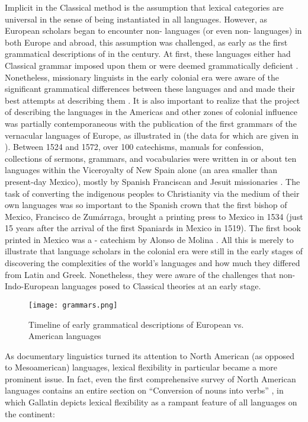 Implicit in the Classical method is the assumption that lexical categories are universal in the sense of being instantiated in all languages. However, as European scholars began to encounter non- languages (or even non- languages) in both Europe and abroad, this assumption was challenged, as early as the first grammatical descriptions of  in the  century. At first, these languages either had Classical grammar imposed upon them or were deemed grammatically deficient \parencite[3]{Suarez1983}. Nonetheless, missionary linguists in the early colonial era were aware of the significant grammatical differences between these languages and  and made their best attempts at describing them \parencite[3--4]{Suarez1983}. It is also important to realize that the project of describing the languages in the Americas and other zones of colonial influence was partially contemporaneous with the publication of the first grammars of the vernacular languages of Europe, as illustrated in  (the data for which are given in ). Between 1524 and 1572, over 100 catechisms, manuals for confession, collections of sermons, grammars, and vocabularies were written in or about ten languages within the Viceroyalty of New Spain alone (an area smaller than present-day Mexico), mostly by Spanish Franciscan and Jesuit missionaries \parencite[2]{Suarez1983}. The task of converting the indigenous peoples to Christianity via the medium of their own languages was so important to the Spanish crown that the first bishop of Mexico, Francisco de Zumárraga, brought a printing press to Mexico in 1534 (just 15 years after the arrival of the first Spaniards in Mexico in 1519). The first book printed in Mexico was a - catechism by Alonso de Molina \parencite[2]{Suarez1983}. All this is merely to illustrate that language scholars in the colonial era were still in the early stages of discovering the complexities of the world's languages and how much they differed from Latin and Greek. Nonetheless, they were aware of the challenges that non-Indo-European languages posed to Classical theories at an early stage.

\begin{figure}
  \texttt{[image: grammars.png]}
  \caption{Timeline of early grammatical descriptions of European vs. American languages}
  \label{fig:grammars}
\end{figure}

As documentary linguistics turned its attention to North American (as opposed to Mesoamerican) languages, lexical flexibility in particular became a more prominent issue. In fact, even the first comprehensive survey of North American languages contains an entire section on \enquote{Conversion of nouns into verbs} \parencite[174--177]{Gallatin1836}, in which Gallatin depicts lexical flexibility as a rampant feature of all languages on the continent:

